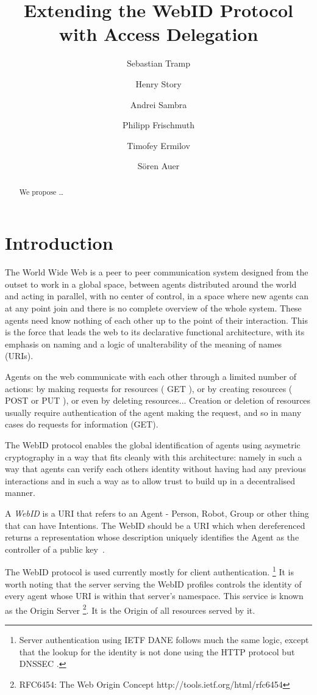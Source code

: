 \documentclass[a4paper]{llncs}
\title{Extending the WebID Protocol with Access Delegation}
\author{Sebastian Tramp\inst{1} \and Henry Story\inst{2} \and Andrei Sambra\inst{3} \and Philipp Frischmuth\inst{1} \and Timofey Ermilov\inst{1} \and S\"oren Auer\inst{1}}
\institute{
Universit\"at Leipzig, Institut f\"ur Informatik, AKSW,\\
Postfach 100920, D-04009 Leipzig, Germany,\\
\email{\{lastname\}@informatik.uni-leipzig.de}\\
\url{http://aksw.org/FirstnameLastname} (WebID)
\medskip\and
Apache Foundation\\ 
\email{henry.story@bblfish.net}\\
\url{http://bblfish.net/people/henry/card\#me} (WebID)
\medskip\and
CNRS Samovar UMR 5157, TELECOM SudParis\\
\email{andrei.sambra@it-sudparis.eu}\\
\url{https://my-profile.eu/people/deiu/card\#me} (WebID)
}
\begin{document}
\maketitle              %

\begin{abstract}
We propose \ldots
\end{abstract}

\section{Introduction}\label{sec:intro}

The World Wide Web is a peer to peer communication system designed from the outset to work in a global space, between agents distributed around the world and acting in parallel, with no center of control, in a space where new agents can at any point join and there is no complete overview of the whole system. These agents need know nothing of each other up to the point of their interaction. This is the force that leads the web to its declarative functional architecture, with its emphasis on naming and a logic of unalterability of the meaning of names (URIs).  
  
Agents on the web communicate with each other through a limited number of actions:  by making requests for resources ( GET ), or by creating resources ( POST or PUT ), or even by deleting resources... Creation or deletion of resources usually require authentication of the agent making the request, and so in many cases do requests for information (GET). 

The WebID protocol enables the global identification of agents using asymetric cryptography in a way that fits cleanly with this architecture: namely in such a way that agents can verify each others identity without having had any previous interactions and in such a way as to allow trust to build up in a decentralised manner.

A \textit{WebID} is a URI that refers to an Agent - Person, Robot, Group or other thing that can have Intentions.  The WebID should be a URI which when dereferenced returns a representation whose description uniquely identifies the Agent as the controller of a public key~\cite{sporny-m-2011--a}.

The WebID protocol is used currently mostly for client authentication. \footnote{Server authentication using IETF DANE follows much the same logic, except that the lookup for the identity is not done using the HTTP protocol but DNSSEC .} It is worth noting that the server serving the WebID profiles controls the identity of every agent whose URI is within that server's namespace. This service is known as the Origin Server \footnote{RFC6454: The Web Origin Concept http://tools.ietf.org/html/rfc6454}. It is the Origin of all resources served by it. 
\end{document}
